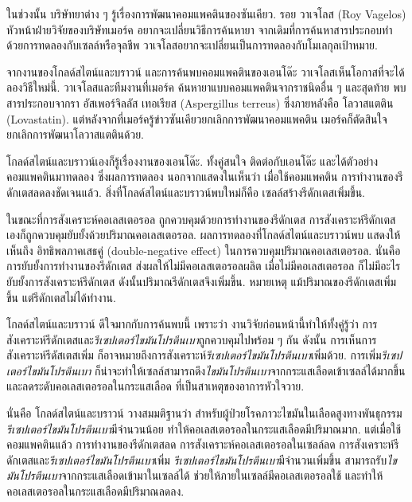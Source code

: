 {\begin{shaded}
ในช่วงนั้น บริษัทยาต่าง ๆ รู้เรื่องการพัฒนาคอมแพคตินของซันเคียว.
รอย วาเจโลส (Roy Vagelos) หัวหน้าฝ่ายวิจัยของบริษัทเมอร์ค
อยากจะเปลี่ยนวิธีการค้นหายา
จากเดิมที่การค้นหาสารประกอบทำด้วยการทดลองกับเซลล์หรือจุลชีพ
วาเจโลสอยากจะเปลี่ยนเป็นการทดลองกับโมเลกุลเป้าหมาย.

จากงานของโกลด์สไตน์และบราวน์ และการค้นพบคอมแพคตินของเอนโด๊ะ 
วาเจโลสเห็นโอกาสที่จะได้ลองวิธีใหม่นี้.
วาเจโลสและทีมงานที่เมอร์ค ค้นหายาแบบคอมแพคตินจากราชนิดอื่น ๆ
และสุดท้าย พบสารประกอบจากรา อัสเพอร์จิลลัส เทอเรียส (Aspergillus terreus) ซึ่งภายหลังคือ โลวาสแตติน (Lovastatin).
แต่หลังจากที่เมอร์ครู้ข่าวซันเคียวยกเลิกการพัฒนาคอมแพคติน เมอร์คก็ตัดสินใจยกเลิกการพัฒนาโลวาสแตตินด้วย.

โกลด์สไตน์และบราวน์เองก็รู้เรื่องงานของเอนโด๊ะ.
ทั้งคู่สนใจ ติดต่อกับเอนโด๊ะ และได้ตัวอย่างคอมแพคตินมาทดลอง
ซึ่งผลการทดลอง
นอกจากแสดงในเห็นว่า
เมื่อใช้คอมแพคติน
การทำงานของรีดักเตสลดลงชัดเจนแล้ว.
สิ่งที่โกลด์สไตน์และบราวน์พบใหม่ก็คือ
เซลล์สร้างรีดักเตสเพิ่มขึ้น.

ในขณะที่การสังเคราะห์คอเลสเตอรอล ถูกควบคุมด้วยการทำงานของรีดักเตส
การสังเคราะห์รีดักเตสเองก็ถูกควบคุมยับยั้งด้วยปริมาณคอเลสเตอรอล.
ผลการทดลองที่โกลด์สไตน์และบราวน์พบ
แสดงให้เห็นถึง อิทธิพลภาคเสธคู่ (double-negative effect) ในการควบคุมปริมาณคอเลสเตอรอล.
นั่นคือ การยับยั้งการทำงานของรีดักเตส ส่งผลให้ไม่มีคอเลสเตอรอลผลิต 
เมื่อไม่มีคอเลสเตอรอล ก็ไม่มีอะไรยับยั้งการสังเคราะห์รีดักเตส
ดังนั้นปริมาณรีดักเตสจึงเพิ่มขึ้น.
หมายเหตุ แม้ปริมาณของรีดักเตสเพิ่มขึ้น แต่รีดักเตสไม่ได้ทำงาน.

โกลด์สไตน์และบราวน์ ดีใจมากกับการค้นพบนี้ 
เพราะว่า งานวิจัยก่อนหน้านี้ทำให้ทั้งคู่รู้ว่า 
การสังเคราะห์รีดักเตสและ\textit{รีเซปเตอร์ไขมันโปรตีนเบา}ถูกควบคุมไปพร้อม ๆ กัน
ดังนั้น การเห็นการสังเคราะห์รีดัสเตสเพิ่ม ก็อาจหมายถึงการสังเคราะห์\textit{รีเซปเตอร์ไขมันโปรตีนเบา}เพิ่มด้วย.
การเพิ่ม\textit{รีเซปเตอร์ไขมันโปรตีนเบา}
ก็น่าจะทำให้เซลล์สามารถดึง\textit{ไขมันโปรตีนเบา}จากกระแสเลือดเข้าเซลล์ได้มากขึ้น
และลดระดับคอเลสเตอรอลในกระแสเลือด ที่เป็นสาเหตุของอาการหัวใจวาย.

นั่นคือ
โกลด์สไตน์และบราวน์ วางสมมติฐานว่า
 สำหรับผู้ป่วยโรคภาวะไขมันในเลือดสูงทางพันธุกรรม
\textit{รีเซปเตอร์ไขมันโปรตีนเบา}มีจำนวนน้อย ทำให้คอเลสเตอรอลในกระแสเลือดมีปริมาณมาก.
แต่เมื่อใช้คอมแพคตินแล้ว การทำงานของรีดักเตสลด การสังเคราะห์คอเลสเตอรอลในเซลล์ลด การสังเคราะห์รีดักเตสและ\textit{รีเซปเตอร์ไขมันโปรตีนเบา}เพิ่ม
\textit{รีเซปเตอร์ไขมันโปรตีนเบา}มีจำนวนเพิ่มขึ้น สามารถรับ\textit{ไขมันโปรตีนเบา}จากกระแสเลือดเข้ามาในเซลล์ได้
ช่วยให้ภายในเซลล์มีคอเลสเตอรอลใช้ และทำให้คอเลสเตอรอลในกระแสเลือดมีปริมาณลดลง.


\end{shaded}}
